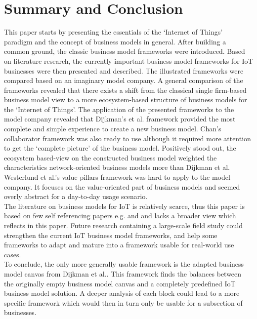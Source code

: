 \section{Summary and Conclusion}
\vspace{-1em}
\label{sec:summary}
	This paper starts by presenting the essentials of the `Internet of Things' paradigm and the concept of business models in general. After building a common ground, the classic business model frameworks were introduced. Based on literature research, the currently important business model frameworks for IoT businesses were then presented and described. The illustrated frameworks were compared based on an imaginary model company. A general comparison of the frameworks revealed that there exists a shift from the classical single firm-based business model view to a more ecosystem-based structure of business models for the `Internet of Things'. The application of the presented frameworks to the model company revealed that Dijkman's et al. framework provided the most complete and simple experience to create a new business model. Chan's collaborator framework was also ready to use although it required more attention to get the `complete picture' of the business model. Positively stood out, the ecosystem based-view on the constructed business model weighted the characteristics network-oriented business models more than Dijkman et al. Westerlund et al.'s value pillars framework was hard to apply to the model company. It focuses on the value-oriented part of business models and seemed overly abstract for a day-to-day usage scenario.\\
	The literature on business models for IoT is relatively scarce, thus this paper is based on few self referencing papers e.g. \cite{ju} and \cite{dijkman} and lacks a broader view which reflects in this paper. Future research containing a large-scale field study could strengthen the current IoT business model frameworks, and help some frameworks to adapt and mature into a framework usable for real-world use cases.\\
	To conclude, the only more generally usable framework is the adapted business model canvas from Dijkman et al.. This framework finds the balances between the originally empty business model canvas and a completely predefined IoT business model solution. A deeper analysis of each block could lead to a more specific framework which would then in turn only be usable for a subsection of businesses.
	\vspace{-10em}
